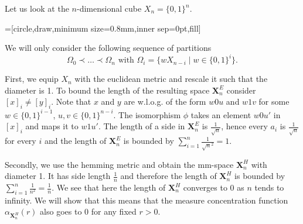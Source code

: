 \begin{example}
Let us look at the $n$-dimensional cube $X_n=\{0,1\}^n$.

\begin{center}
=[circle,draw,minimum size=0.8mm,inner sep=0pt,fill]
\end{center}
We will only consider the following sequence of partitions
\[\Omega_0\prec\dots\prec\Omega_n\text{ with }\Omega_i=\{wX_{n-i}\mid w\in\{0,1\}^i\}.\]

First, we equip $X_n$ with the euclidean metric and rescale it such that the diameter is 1. To bound the length of the resulting space $\boldsymbol X^E_n$ consider $[x]_i\neq[y]_i$. Note that $x$ and $y$ are w.l.o.g. of the form $w0u$ and $w1v$ for some $w\in\{0,1\}^{i-1}$, $u,v\in\{0,1\}^{n-i}$. The isomorphism $\phi$ takes an element $w0u'$ in $[x]_i$ and maps it to $w1u'$. The length of a side in $\boldsymbol X^E_n$ is $\frac{1}{\sqrt{n}}$, hence every $a_i$ is $\frac{1}{\sqrt{n}}$ for every $i$ and the length of $\boldsymbol{X}^E_n$ is bounded by $\sum_{i=1}^{n}\frac{1}{\sqrt{n}^2}=1$.

Secondly, we use the hemming metric and obtain the mm-space $\boldsymbol{X}^H_n$ with diameter 1. It has side length $\frac{1}{n}$ and therefore the length of $\boldsymbol{X}^H_n$ is bounded by $\sum_{i=1}^{n}\frac{1}{n^2}=\frac{1}{n}$. We see that here the length of $\boldsymbol{X}^H_n$ converges to 0 as $n$ tends to infinity. We will show that this means that the measure concentration function $\alpha_{\boldsymbol{X}^H_n}(r)$ also goes to 0 for any fixed $r>0$. 
\end{example}



